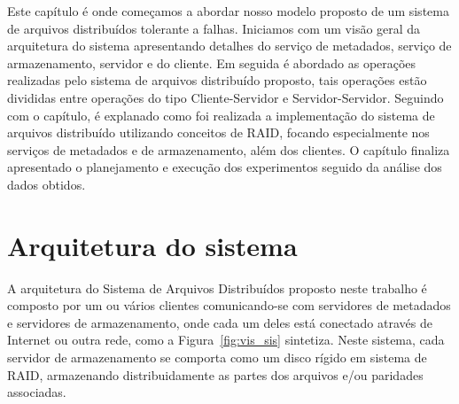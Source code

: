Este capítulo é onde começamos a abordar nosso modelo proposto de um sistema de arquivos distribuídos tolerante a falhas. Iniciamos com um visão geral da arquitetura do sistema apresentando detalhes do serviço de metadados, serviço de armazenamento, servidor e do cliente. Em seguida é abordado as operações realizadas pelo sistema de arquivos distribuído proposto, tais operações estão divididas entre operações do tipo Cliente-Servidor e Servidor-Servidor. Seguindo com o capítulo, é explanado como foi realizada a implementação do sistema de arquivos distribuído utilizando conceitos de RAID, focando especialmente nos serviços de metadados e de armazenamento, além dos clientes. O capítulo finaliza apresentado o planejamento e execução dos experimentos seguido da análise dos dados obtidos.


	\section{Arquitetura do sistema}
	
	A arquitetura do Sistema de Arquivos Distribuídos proposto neste trabalho é composto por um ou vários clientes comunicando-se com servidores de metadados e servidores de armazenamento, onde cada um deles está conectado através de Internet ou outra rede, como a Figura~\ref{fig:vis_sis}  sintetiza. Neste sistema, cada servidor de armazenamento se comporta como um disco rígido em sistema de RAID, armazenando distribuidamente as partes dos arquivos e/ou paridades associadas. \\
	
	


